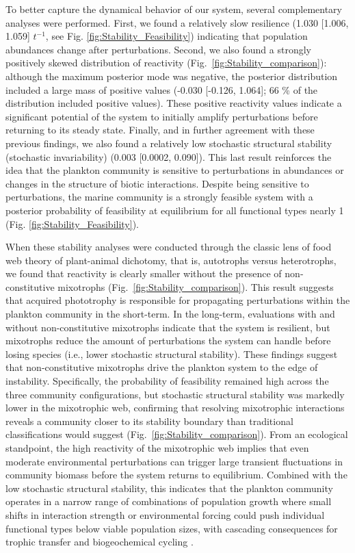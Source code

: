 \documentclass[12pt]{article}
\begin{document}
To better capture the dynamical behavior of our system, several complementary analyses were performed. First, we found a relatively slow resilience (1.030 [1.006, 1.059] $ t^{-1} $, see Fig. \ref{fig:Stability_Feasibility}) indicating that population abundances change after perturbations. Second, we also found a strongly positively skewed distribution of reactivity (Fig.~\ref{fig:Stability_comparison}): although the maximum posterior mode was negative, the posterior distribution included a large mass of positive values (-0.030 [-0.126, 1.064]; 66 \% of the distribution included positive values). These positive reactivity values indicate a significant potential of the system to initially amplify perturbations before returning to its steady state. Finally, and in further agreement with these previous findings, we also found a relatively low stochastic structural stability (stochastic invariability) (0.003 [0.0002, 0.090]). This last result reinforces the idea that the plankton community is sensitive to perturbations in abundances or changes in the structure of biotic interactions. Despite being sensitive to perturbations, the marine community is a strongly feasible system with a posterior probability of feasibility at equilibrium for all functional types nearly 1 (Fig. \ref{fig:Stability_Feasibility}).

When these stability analyses were conducted through the classic lens of food web theory of plant-animal dichotomy, that is, autotrophs versus heterotrophs, we found that reactivity is clearly smaller without the presence of non-constitutive mixotrophs (Fig.~\ref{fig:Stability_comparison}). This result suggests that acquired phototrophy is responsible for propagating perturbations within the plankton community in the short-term. In the long-term, evaluations with and without non-constitutive mixotrophs indicate that the system is resilient, but mixotrophs reduce the amount of perturbations the system can handle before losing species (i.e., lower stochastic structural stability). These findings suggest that non-constitutive mixotrophs drive the plankton system to the edge of instability. Specifically, the probability of feasibility remained high across the three community configurations, but stochastic structural stability was markedly lower in the mixotrophic web, confirming that resolving mixotrophic interactions reveals a community closer to its stability boundary than traditional classifications would suggest (Fig.~\ref{fig:Stability_comparison}). From an ecological standpoint, the high reactivity of the mixotrophic web implies that even moderate environmental perturbations can trigger large transient fluctuations in community biomass before the system returns to equilibrium. Combined with the low stochastic structural stability, this indicates that the plankton community operates in a narrow range of combinations of population growth where small shifts in interaction strength or environmental forcing could push individual functional types below viable population sizes, with cascading consequences for trophic transfer and biogeochemical cycling \citep{Lotze2019}.
\end{document}
